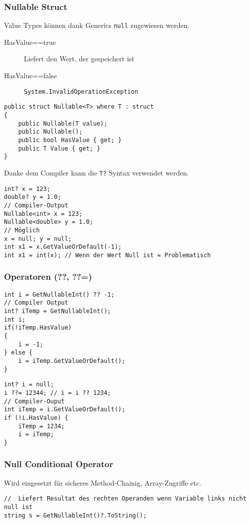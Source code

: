 \subsubsection{Nullable Struct}
Value Types können dank Generics \lstinline{null} zugewiesen werden.
\begin{description}
  \item[HasValue==true] Liefert den Wert, der gespeichert ist
  \item[HasValue==false] \lstinline{System.InvalidOperationException}
\end{description}


\begin{lstlisting}
public struct Nullable<T> where T : struct
{
	public Nullable(T value);
	public Nullable();
	public bool HasValue { get; }
	public T Value { get; }
}
\end{lstlisting}

Danke dem Compiler kann die \lstinline{T?} Syntax verwendet werden. 
\begin{lstlisting}
int? x = 123;
double? y = 1.0;
// Compiler-Output
Nullable<int> x = 123;
Nullable<double> y = 1.0;
// Möglich
x = null; y = null;
int x1 = x.GetValueOrDefault(-1);
int x1 = int(x); // Wenn der Wert Null ist = Problematisch
\end{lstlisting}

\subsubsection{Operatoren (??, ??=)}
\begin{lstlisting}
int i = GetNullableInt() ?? -1;
// Compiler Output
int? iTemp = GetNullableInt();
int i;
if(!iTemp.HasValue) 
{
	i = -1;
} else {
	i = iTemp.GetValueOrDefault();
}
\end{lstlisting}

\begin{lstlisting}
int? i = null;
i ??= 12344; // i = i ?? 1234;
// Compiler-Ouput
int iTemp = i.GetValueOrDefault();
if (!i.HasValue) {
	iTemp = 1234;
	i = iTemp;
}
\end{lstlisting}

\subsubsection{Null Conditional Operator}
Wird eingesetzt für sicheres Method-Chainig, Array-Zugriffe etc.
\begin{lstlisting}
//  Liefert Resultat des rechten Operanden wenn Variable links nicht null ist
string s = GetNullableInt()?.ToString();
\end{lstlisting}

